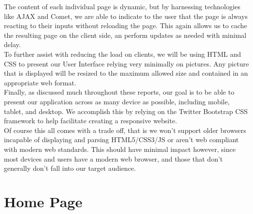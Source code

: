The content of each individual page is dynamic, but by harnessing technologies
like AJAX\cite{wiki:ajax} and Comet\cite{wiki:comt}, we are able to indicate to
the user that the page
is always reacting to their inputs without reloading the page.  This again
allows us to cache the resulting page on the client side, an perform updates
as needed with minimal delay.\\

To further assist with reducing the load on clients, we will be using
HTML\cite{wiki:html} and CSS\cite{wiki:css} to present our User Interface
relying very minimally on pictures.  Any picture that is displayed will be
resized to the maximum allowed size and contained in an appropriate web format.\\

Finally, as discussed much throughout these reports, our goal is to be able to
present our application across as many device as possible, including mobile,
tablet, and desktop.  We accomplish this by relying on the Twitter
Bootstrap\cite{wiki:boot} CSS framework to help facilitate creating a responsive
website.\\

Of course this all comes with a trade off, that is we won't support older
browsers incapable of displaying and parsing HTML5/CSS3/JS or aren't web
compliant with modern web standards.  This should have minimal impact however,
since most devices and users have a modern web browser, and those that don't
generally don't fall into our target audience.\\

\section{Home Page}

